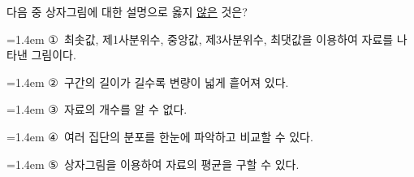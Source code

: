 다음 중 상자그림에 대한 설명으로 옳지 \underline{않은} 것은?
\par\medskip\par\noindent\hangindent=1.4em {\small ①}\ 최솟값, 제1사분위수, 중앙값, 제3사분위수, 최댓값을 이용하여 자료를 나타낸 그림이다.\par\noindent\hangindent=1.4em {\small ②}\ 구간의 길이가 길수록 변량이 넓게 흩어져 있다.\par\noindent\hangindent=1.4em {\small ③}\ 자료의 개수를 알 수 없다.\par\noindent\hangindent=1.4em {\small ④}\ 여러 집단의 분포를 한눈에 파악하고 비교할 수 있다.\par\noindent\hangindent=1.4em {\small ⑤}\ 상자그림을 이용하여 자료의 평균을 구할 수 있다.\par\medskip
